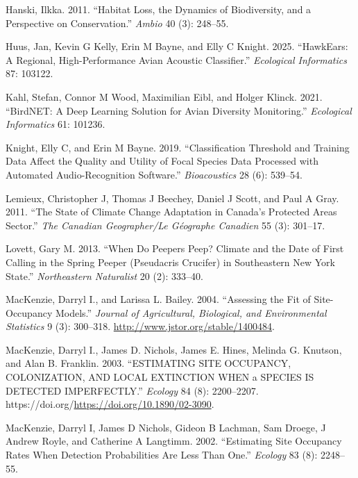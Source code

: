 \documentclass[
  letterpaper,
  DIV=11,
  numbers=noendperiod]{scrartcl}
\newlength{\cslhangindent}
\newenvironment{CSLReferences}[2] %
 {\begin{list}{}{%
  \setlength{\itemindent}{0pt}
  \setlength{\leftmargin}{0pt}
  \setlength{\parsep}{0pt}
  \ifodd #1
   \setlength{\leftmargin}{\cslhangindent}
   \setlength{\itemindent}{-1\cslhangindent}
  \fi
  \setlength{\itemsep}{#2\baselineskip}}}
 {\end{list}}
\begin{document}
\begin{CSLReferences}{1}{0}
Hanski, Ilkka. 2011. {``Habitat Loss, the Dynamics of Biodiversity, and
a Perspective on Conservation.''} \emph{Ambio} 40 (3): 248--55.

Huus, Jan, Kevin G Kelly, Erin M Bayne, and Elly C Knight. 2025.
{``HawkEars: A Regional, High-Performance Avian Acoustic Classifier.''}
\emph{Ecological Informatics} 87: 103122.

Kahl, Stefan, Connor M Wood, Maximilian Eibl, and Holger Klinck. 2021.
{``BirdNET: A Deep Learning Solution for Avian Diversity Monitoring.''}
\emph{Ecological Informatics} 61: 101236.

Knight, Elly C, and Erin M Bayne. 2019. {``Classification Threshold and
Training Data Affect the Quality and Utility of Focal Species Data
Processed with Automated Audio-Recognition Software.''}
\emph{Bioacoustics} 28 (6): 539--54.

Lemieux, Christopher J, Thomas J Beechey, Daniel J Scott, and Paul A
Gray. 2011. {``The State of Climate Change Adaptation in Canada's
Protected Areas Sector.''} \emph{The Canadian Geographer/Le G{é}ographe
Canadien} 55 (3): 301--17.

Lovett, Gary M. 2013. {``When Do Peepers Peep? Climate and the Date of
First Calling in the Spring Peeper (Pseudacris Crucifer) in Southeastern
New York State.''} \emph{Northeastern Naturalist} 20 (2): 333--40.

MacKenzie, Darryl I., and Larissa L. Bailey. 2004. {``Assessing the Fit
of Site-Occupancy Models.''} \emph{Journal of Agricultural, Biological,
and Environmental Statistics} 9 (3): 300--318.
\url{http://www.jstor.org/stable/1400484}.

MacKenzie, Darryl I., James D. Nichols, James E. Hines, Melinda G.
Knutson, and Alan B. Franklin. 2003. {``ESTIMATING SITE OCCUPANCY,
COLONIZATION, AND LOCAL EXTINCTION WHEN a SPECIES IS DETECTED
IMPERFECTLY.''} \emph{Ecology} 84 (8): 2200--2207.
https://doi.org/\url{https://doi.org/10.1890/02-3090}.

MacKenzie, Darryl I, James D Nichols, Gideon B Lachman, Sam Droege, J
Andrew Royle, and Catherine A Langtimm. 2002. {``Estimating Site
Occupancy Rates When Detection Probabilities Are Less Than One.''}
\emph{Ecology} 83 (8): 2248--55.


\end{CSLReferences}
\end{document}
